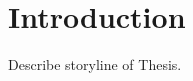\setcounter{equation}{0}
\setcounter{figure}{0}
\setcounter{table}{0}

\chapter{\label{chapter1} Introduction}

Describe storyline of Thesis. 



